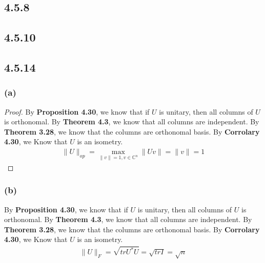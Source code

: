 \documentclass{article}
\newtheorem*{proof}{Proof}
\begin{document}
\subsection*{4.5.8}  %
\subsection*{4.5.10} %
\subsection*{4.5.14}
\subsubsection*{(a)}
\begin{proof}
    By \textbf{Proposition 4.30}, we know that if $U$ is unitary, then all columns of $U$ is orthonomal. By \textbf{Theorem 4.3}, we know that all columns are independent. 
    By \textbf{Theorem 3.28}, we know that the columns are orthonomal basis. By \textbf{Corrolary 4.30}, we Know that $U$ is an isometry.
    \begin{equation*}
        \begin{split}
            \|U\|_{op} = \mathop{max} \limits _ {\|v\| = 1, v \in \mathbb{C}^n} \|Uv\| = \|v\| = 1
        \end{split}
    \end{equation*}
\end{proof}

\subsubsection*{(b)}
By \textbf{Proposition 4.30}, we know that if $U$ is unitary, then all columns of $U$ is orthonomal. By \textbf{Theorem 4.3}, we know that all columns are independent. 
By \textbf{Theorem 3.28}, we know that the columns are orthonomal basis. By \textbf{Corrolary 4.30}, we Know that $U$ is an isometry.
\begin{equation*}
    \begin{split}
        \|U\|_F = \sqrt{trU^*U }= \sqrt{trI} = \sqrt{n}
    \end{split}
\end{equation*}
\end{document}
